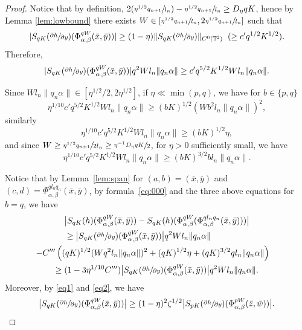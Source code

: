 \documentclass[10pt]{amsart}
\newcommand{\Psfrac}[2]{(\sfrac{#1}{#2})}
\theoremstyle{definition}
\theoremstyle{plain}
\newcommand\TT{\mathbb{T}}
\begin{document}
\begin{proof}
Notice that by definition,
$2\Psfrac{\eta^{1/2}q_{n+1}}{l_n}-\sfrac{\eta^{1/2}q_{n+1}}{l_n}\geq D_\eta qK$, hence
by Lemma \ref{lem:lowbound} there exists $W\in [\sfrac{\eta^{1/2}q_{n+1}}{l_n},2\sfrac{\eta^{1/2}q_{n+1}}{l_n}]$ such that
\begin{equation}\label{eq1}
|S_{qK}(\sfrac{\partial h}{\partial y})(\Phi_{\alpha,\beta}^{qW}(\bar{x},\bar{y}))|\geq (1-\eta)\|S_{qK}(\sfrac{\partial h}{\partial y})\|_{C^0(\TT^2) }\;\; (\geq c' q^{1/2}K^{1/2}).
\end{equation}
Therefore,
\begin{equation}\label{eq:000}
|S_{qK}(\sfrac{\partial h}{\partial y})(\Phi_{\alpha,\beta}^{qW}(\bar{x},\bar{y}))|
q^2Wl_n\|q_n\alpha\|\geq c'q^{5/2}K^{1/2}Wl_n\|q_n\alpha\|.
\end{equation}

Since $Wl_n\|q_n\alpha\|\in [\eta^{1/2}/2, 2\eta^{1/2}]$, if $\eta\ll \min(p,q)$, we have for $b\in\{p,q\}$
\[
\eta^{1/10} c'q^{5/2}K^{1/2}Wl_n\|q_n\alpha\|\geq (bK)^{1/2}(Wb^2l_n\|q_n\alpha\|)^2,
\]
similarly
\[
\eta^{1/10} c'q^{5/2}K^{1/2}Wl_n\|q_n\alpha\| \geq (bK)^{1/2}\eta,
\]
and since $W\geq \sfrac{\eta^{1/2}q_{n+1}}{2l_n}\geq \sfrac{\eta^{-1} D_\eta qK}{2}$, for $\eta>0$ sufficiently small, we have
\[
\eta^{1/10} c'q^{5/2}K^{1/2}Wl_n\|q_n\alpha\|\geq (bK)^{3/2}bl_n\|q_n\alpha\|.
\]

Notice that by Lemma~\ref{lem:span} for $(a,b)=(\bar{x},\bar{y})$ and $(c,d)=\Phi_{\alpha,\beta}^{ql_nq_n}(\bar{x},\bar{y})$, by formula~\eqref{eq:000} and the three above equations for $b=q$, we have\vspace*{-5pt}
\begin{multline*}
\bigl\vert S_{qK}(h)(\Phi_{\alpha,\beta}^{qW}(\bar{x},\bar{y})) - S_{qK}(h)(\Phi_{\alpha,\beta}^{qW}(\Phi_{\alpha,\beta}^{ql_nq_n}(\bar{x},\bar{y})))\bigr\vert \\
\hspace*{-1.5cm}\geq
\bigl\vert S_{qK}(\sfrac{\partial h}{\partial y})(\Phi_{\alpha,\beta}^{qW}(\bar{x},\bar{y}))\bigr\vert q^2W l_n \|q_n \alpha \| \\
\shoveright{- C''' \left( (q K)^{1/2}(Wq^2 l_n \Vert q_n \alpha \Vert )^2+(q K)^{1/2} \eta + (q K)^{3/2} q l_n\Vert q_n \alpha \Vert \right)}
\\ \geq (1-3\eta^{1/10}C''')\bigl| S_{qK}(\sfrac{\partial h}{\partial y})(\Phi_{\alpha,\beta}^{qW}(\bar{x},\bar{y}))\bigr| q^2Wl_n\|q_n\alpha\|.
\end{multline*}
Moreover, by \eqref{eq1} and \eqref{eq2}, we have
\[
\bigl|S_{qK}(\sfrac{\partial h}{\partial y})(\Phi_{\alpha,\beta}^{qW}(\bar{x},\bar{y}))\bigr|
\geq (1-\eta)^2\zeta^{1/2}
\bigl|S_{pK}(\sfrac{\partial h}{\partial y})(\Phi_{\alpha,\beta}^{pW}(\bar{z},\bar{w}))\bigr|.
\]


\end{proof}
\end{document}
